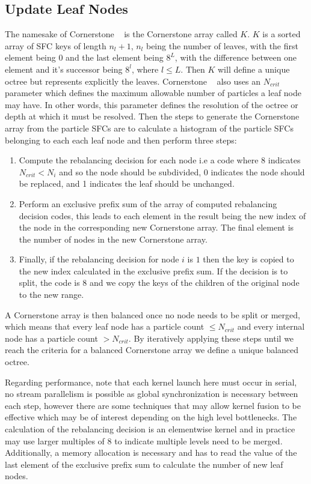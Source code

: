 \subsection{Update Leaf Nodes}
The namesake of Cornerstone ~\cite{cornerstone} is the Cornerstone array called $K$. $K$ is a sorted array of SFC keys of length $n_l+1$, $n_l$ being the number of leaves, with the first element being $0$ and the last element being $8^L$, with the difference between one element and it's successor being $8^l$, where $l \le L$. Then $K$ will define a unique octree but represents explicitly the leaves. Cornerstone ~\cite{cornerstone} also uses an $N_{crit}$ parameter which defines the maximum allowable number of particles a leaf node may have. In other words, this parameter defines the resolution of the octree or depth at which it must be resolved. Then the steps to generate the Cornerstone array from the particle SFCs are to calculate a histogram of the particle SFCs belonging to each each leaf node and then perform three steps:
\begin{enumerate}
    \item Compute the rebalancing decision for each node i.e a code where 8 indicates $N_{crit} < N_i$ and so the node should be subdivided, 0 indicates the node should be replaced, and 1 indicates the leaf should be unchanged.
    \item Perform an exclusive prefix sum of the array of computed rebalancing decision codes, this leads to each element in the result being the new index of the node in the corresponding new Cornerstone array. The final element is the number of nodes in the new Cornerstone array.
    \item Finally, if the rebalancing decision for node $i$ is $1$ then the key is copied to the new index calculated in the exclusive prefix sum. If the decision is to split, the code is $8$ and we copy the keys of the children of the original node to the new range.
\end{enumerate}
A Cornerstone array is then balanced once no node needs to be split or merged, which means that every leaf node has a particle count $\le N_{crit}$ and every internal node has a particle count $> N_{crit}$. By iteratively applying these steps until we reach the criteria for a balanced Cornerstone array we define a unique balanced octree. 

Regarding performance, note that each kernel launch here must occur in serial, no stream parallelism is possible as global synchronization is necessary between each step, however there are some techniques that may allow kernel fusion to be effective which may be of interest depending on the high level bottlenecks. The calculation of the rebalancing decision is an elementwise kernel and in practice may use larger multiples of $8$ to indicate multiple levels need to be merged. Additionally, a memory allocation is necessary and has to read the value of the last element of the exclusive prefix sum to calculate the number of new leaf nodes. 


